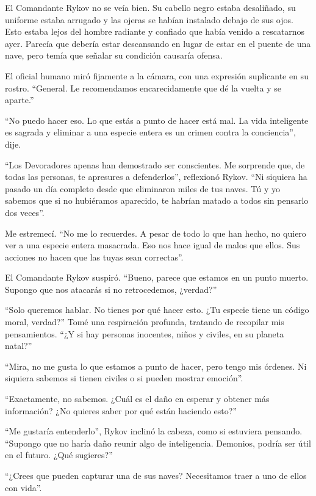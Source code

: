 El Comandante Rykov no se veía bien. Su cabello negro estaba desaliñado, su uniforme estaba arrugado y las ojeras se habían instalado debajo de sus ojos. Esto estaba lejos del hombre radiante y confiado que había venido a rescatarnos ayer. Parecía que debería estar descansando en lugar de estar en el puente de una nave, pero temía que señalar su condición causaría ofensa.

El oficial humano miró fijamente a la cámara, con una expresión suplicante en su rostro. “General. Le recomendamos encarecidamente que dé la vuelta y se aparte.”

“No puedo hacer eso. Lo que estás a punto de hacer está mal. La vida inteligente es sagrada y eliminar a una especie entera es un crimen contra la conciencia”, dije.

“Los Devoradores apenas han demostrado ser conscientes. Me sorprende que, de todas las personas, te apresures a defenderlos”, reflexionó Rykov. “Ni siquiera ha pasado un día completo desde que eliminaron miles de tus naves. Tú y yo sabemos que si no hubiéramos aparecido, te habrían matado a todos sin pensarlo dos veces”.

Me estremecí. “No me lo recuerdes. A pesar de todo lo que han hecho, no quiero ver a una especie entera masacrada. Eso nos hace igual de malos que ellos. Sus acciones no hacen que las tuyas sean correctas”.

El Comandante Rykov suspiró. “Bueno, parece que estamos en un punto muerto. Supongo que nos atacarás si no retrocedemos, ¿verdad?”

“Solo queremos hablar. No tienes por qué hacer esto. ¿Tu especie tiene un código moral, verdad?” Tomé una respiración profunda, tratando de recopilar mis pensamientos. “¿Y si hay personas inocentes, niños y civiles, en su planeta natal?”

“Mira, no me gusta lo que estamos a punto de hacer, pero tengo mis órdenes. Ni siquiera sabemos si tienen civiles o si pueden mostrar emoción”.

“Exactamente, no sabemos. ¿Cuál es el daño en esperar y obtener más información? ¿No quieres saber por qué están haciendo esto?”

“Me gustaría entenderlo”, Rykov inclinó la cabeza, como si estuviera pensando. “Supongo que no haría daño reunir algo de inteligencia. Demonios, podría ser útil en el futuro. ¿Qué sugieres?”

“¿Crees que pueden capturar una de sus naves? Necesitamos traer a uno de ellos con vida”.

